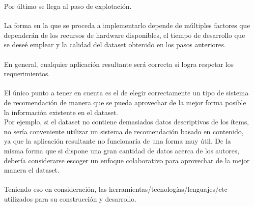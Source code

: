\noindent Por último se llega al paso de explotación. 
\\\\
La forma en la que se proceda a implementarlo depende de múltiples factores que dependerán 
de los recursos de hardware disponibles, el tiempo de desarrollo que se deseé emplear y 
la calidad del dataset obtenido en los pasos anteriores.
\\\\
En general, cualquier aplicación resultante será correcta si logra respetar los requerimientos.
\\\\
El único punto a tener en cuenta es el de elegir correctamente un tipo de sistema de recomendación 
de manera que se pueda aprovechar de la mejor forma posible la información existente en el dataset. \\
Por ejemplo, si el dataset no contiene demasiados datos descriptivos de los ítems, no sería 
conveniente utilizar un sistema de recomendación basado en contenido, ya que la aplicación resultante 
no funcionaría de una forma muy útil.
De la misma forma que si dispone una gran cantidad de datos acerca de los autores, debería considerarse 
escoger un enfoque colaborativo para aprovechar de la mejor manera el dataset.
\\
\\
Teniendo eso en consideración, las herramientas/tecnologías/lenguajes/etc utilizados para su 
construcción y desarrollo.

